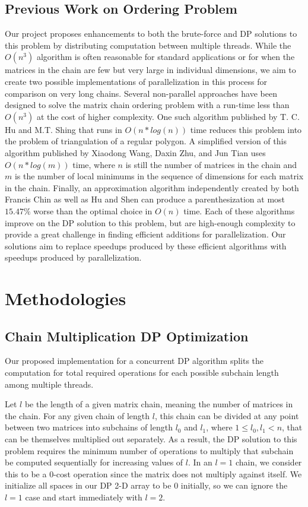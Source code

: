 \documentclass[conference,leqno]{IEEEtran}
\begin{document}
\subsection{Previous Work on Ordering Problem}
Our project proposes enhancements to both the brute-force and DP solutions to this problem by distributing computation between multiple threads. While the $O(n^3)$ algorithm is often reasonable for standard applications or for when the matrices in the chain are few but very large in individual dimensions, we aim to create two possible implementations of parallelization in this process for comparison on very long chains.
Several non-parallel approaches have been designed to solve the matrix chain ordering problem with a run-time less than $O(n^3)$ at the cost of higher complexity. One such algorithm published by T. C. Hu and M.T. Shing that runs in $O(n*log(n))$ time reduces this problem into the problem of triangulation of a regular polygon\cite{b1}. A simplified version of this algorithm published by Xiaodong Wang, Daxin Zhu, and Jun Tian uses $O(n*log(m))$ time, where $n$ is still the number of matrices in the chain and $m$ is the number of local minimums in the sequence of dimensions for each matrix in the chain\cite{b2}. Finally, an approximation algorithm independently created by both Francis Chin\cite{b3} as well as Hu and Shen\cite{b4} can produce a parenthesization at most $15.47\%$ worse than the optimal choice in $O(n)$ time. Each of these algorithms improve on the DP solution to this problem, but are high-enough complexity to provide a great challenge in finding efficient additions for parallelization. Our solutions aim to replace speedups produced by these efficient algorithms with speedups produced by parallelization.

\section{Methodologies}
\subsection{Chain Multiplication DP Optimization}
Our proposed implementation for a concurrent DP algorithm splits the computation for total required operations for each possible subchain length among multiple threads.

Let $l$ be the length of a given matrix chain, meaning the number of matrices in the chain. For any given chain of length $l$, this chain can be divided at any point between two matrices into subchains of length $l_0$ and $l_1$, where $1 \leq l_0, l_1 < n$, that can be themselves multiplied out separately. As a result, the DP solution to this problem requires the minimum number of operations to multiply that subchain be computed sequentially for increasing values of $l$. In an $l = 1$ chain, we consider this to be a $0$-cost operation since the matrix does not multiply against itself. We initialize all spaces in our DP 2-D array to be $0$ initially, so we can ignore the $l = 1$ case and start immediately with $l = 2$.
\end{document}
